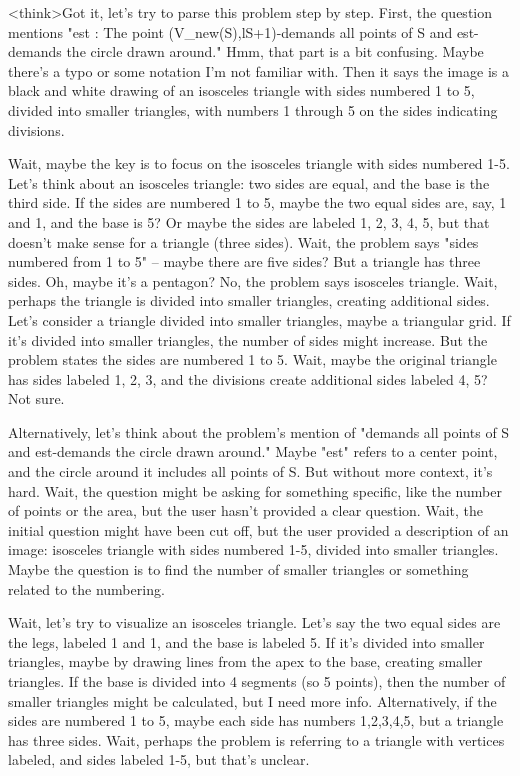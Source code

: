 <think>Got it, let's try to parse this problem step by step. First, the question mentions "est : The point (V_new(S),lS+1)-demands all points of S and est-demands the circle drawn around." Hmm, that part is a bit confusing. Maybe there's a typo or some notation I'm not familiar with. Then it says the image is a black and white drawing of an isosceles triangle with sides numbered 1 to 5, divided into smaller triangles, with numbers 1 through 5 on the sides indicating divisions.

Wait, maybe the key is to focus on the isosceles triangle with sides numbered 1-5. Let's think about an isosceles triangle: two sides are equal, and the base is the third side. If the sides are numbered 1 to 5, maybe the two equal sides are, say, 1 and 1, and the base is 5? Or maybe the sides are labeled 1, 2, 3, 4, 5, but that doesn't make sense for a triangle (three sides). Wait, the problem says "sides numbered from 1 to 5" – maybe there are five sides? But a triangle has three sides. Oh, maybe it's a pentagon? No, the problem says isosceles triangle. Wait, perhaps the triangle is divided into smaller triangles, creating additional sides. Let's consider a triangle divided into smaller triangles, maybe a triangular grid. If it's divided into smaller triangles, the number of sides might increase. But the problem states the sides are numbered 1 to 5. Wait, maybe the original triangle has sides labeled 1, 2, 3, and the divisions create additional sides labeled 4, 5? Not sure.

Alternatively, let's think about the problem's mention of "demands all points of S and est-demands the circle drawn around." Maybe "est" refers to a center point, and the circle around it includes all points of S. But without more context, it's hard. Wait, the question might be asking for something specific, like the number of points or the area, but the user hasn't provided a clear question. Wait, the initial question might have been cut off, but the user provided a description of an image: isosceles triangle with sides numbered 1-5, divided into smaller triangles. Maybe the question is to find the number of smaller triangles or something related to the numbering.

Wait, let's try to visualize an isosceles triangle. Let's say the two equal sides are the legs, labeled 1 and 1, and the base is labeled 5. If it's divided into smaller triangles, maybe by drawing lines from the apex to the base, creating smaller triangles. If the base is divided into 4 segments (so 5 points), then the number of smaller triangles might be calculated, but I need more info. Alternatively, if the sides are numbered 1 to 5, maybe each side has numbers 1,2,3,4,5, but a triangle has three sides. Wait, perhaps the problem is referring to a triangle with vertices labeled, and sides labeled 1-5, but that's unclear.

